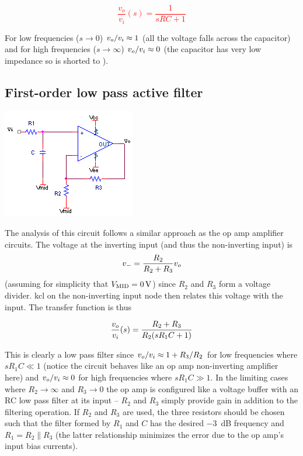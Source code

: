 \textcolor{red}{
\begin{equation}
\frac{v_{o}}{v_{i}}(s) = \frac{1}{sRC+1}
\label{eq:rcLPfilter}
\end{equation}
}

For low frequencies ($s \to 0$) $\vout/\vin \approx 1$ (all the voltage falls across the capacitor) and for high frequencies ($s \to \infty$) $\vout/\vin \approx 0$ (the capacitor has very low impedance so \vout is shorted to \gnd).

\subsection{First-order low pass active filter}
\begin{center}
	\includegraphics{schematics/1storderLPfilter.PNG}
\end{center}
The analysis of this circuit follows a similar approach as the op amp amplifier circuits.
The voltage at the inverting input (and thus the non-inverting input) is \[v_- = \frac{R_2}{R_2 + R_3}\vout\] (assuming for simplicity that $V_\mathrm{MID} = \SI{0}{V}$) since $R_2$ and $R_3$ form a voltage divider.
\ac{kcl} on the non-inverting input node then relates this voltage with the input.
The transfer function is thus

\textcolor{red}{
\begin{equation}
\frac{\vout}{\vin}(s) = \frac{R_2 + R_3}{R_2(sR_1 C + 1)}
\label{eq:1storderLPfilter}
\end{equation}
}

This is clearly a low pass filter since $\vout/\vin \approx 1 + R_3/R_2$ for low frequencies where $sR_1 C \ll 1$ (notice the circuit behaves like an op amp non-inverting amplifier here) and $\vout/\vin \approx 0$ for high frequencies where $sR_{1}C \gg 1$.
In the limiting cases where $R_2 \to \infty$ and $R_3 \to 0$ the op amp is configured like a voltage buffer with an RC low pass filter at its input -- $R_2$ and $R_3$ simply provide gain in addition to the filtering operation.
If $R_2$ and $R_3$ are used, the three resistors should be chosen such that the filter formed by $R_1$ and $C$ has the desired \SI{-3}{dB} frequency and $R_1 = R_2 \parallel R_3$ (the latter relationship minimizes the error due to the op amp's input bias currents).

